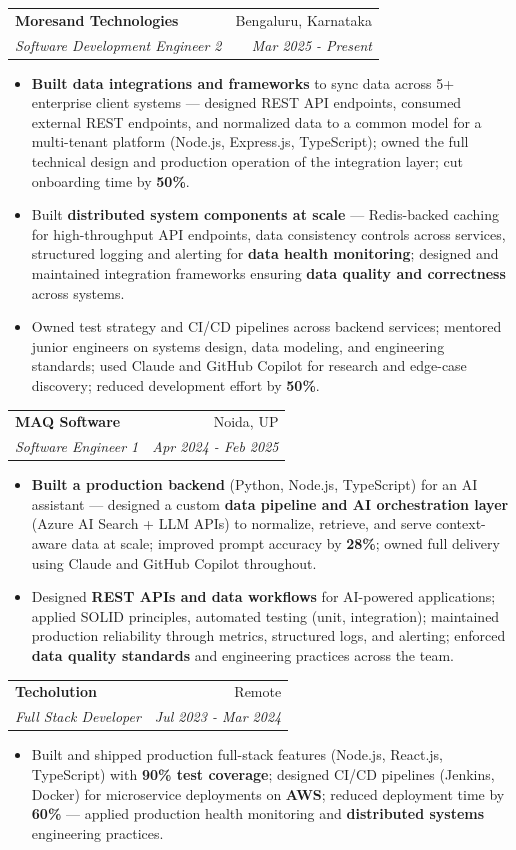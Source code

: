 \documentclass[a4paper,20pt]{article}
\makeatletter
\newcommand{\resumeSubheading}[4]{
  \vspace{-1pt}\item
    \begin{tabular*}{0.97\textwidth}{l@{\extracolsep{\fill}}r}
      \textbf{#1} & #2 \\
      \textit{#3} & \textit{#4} \\
    \end{tabular*}\vspace{-5pt}
}
\newcommand{\resumeItemListStart}{\begin{itemize}}
\newcommand{\resumeItemListEnd}{\end{itemize}\vspace{-5pt}}
\makeatother
\begin{document}
    \resumeSubheading{Moresand Technologies}{Bengaluru, Karnataka}
      {Software Development Engineer 2}{Mar 2025 - Present}
      \resumeItemListStart
        \item \textnormal{\textbf{Built data integrations and frameworks} to sync data across 5+ enterprise client systems --- designed REST API endpoints, consumed external REST endpoints, and normalized data to a common model for a multi-tenant platform (Node.js, Express.js, TypeScript); owned the full technical design and production operation of the integration layer; cut onboarding time by \textbf{50\%}.}
        \item \textnormal{Built \textbf{distributed system components at scale} --- Redis-backed caching for high-throughput API endpoints, data consistency controls across services, structured logging and alerting for \textbf{data health monitoring}; designed and maintained integration frameworks ensuring \textbf{data quality and correctness} across systems.}
        \item \textnormal{Owned test strategy and CI/CD pipelines across backend services; mentored junior engineers on systems design, data modeling, and engineering standards; used Claude and GitHub Copilot for research and edge-case discovery; reduced development effort by \textbf{50\%}.}
      \resumeItemListEnd

    \resumeSubheading{MAQ Software}{Noida, UP}
      {Software Engineer 1}{Apr 2024 - Feb 2025}
      \resumeItemListStart
        \item \textnormal{\textbf{Built a production backend} (Python, Node.js, TypeScript) for an AI assistant --- designed a custom \textbf{data pipeline and AI orchestration layer} (Azure AI Search + LLM APIs) to normalize, retrieve, and serve context-aware data at scale; improved prompt accuracy by \textbf{28\%}; owned full delivery using Claude and GitHub Copilot throughout.}
        \item \textnormal{Designed \textbf{REST APIs and data workflows} for AI-powered applications; applied SOLID principles, automated testing (unit, integration); maintained production reliability through metrics, structured logs, and alerting; enforced \textbf{data quality standards} and engineering practices across the team.}
      \resumeItemListEnd

    \resumeSubheading{Techolution}{Remote}
      {Full Stack Developer}{Jul 2023 - Mar 2024}
      \resumeItemListStart
        \item \textnormal{Built and shipped production full-stack features (Node.js, React.js, TypeScript) with \textbf{90\% test coverage}; designed CI/CD pipelines (Jenkins, Docker) for microservice deployments on \textbf{AWS}; reduced deployment time by \textbf{60\%} --- applied production health monitoring and \textbf{distributed systems} engineering practices.}
      \resumeItemListEnd
\end{document}
